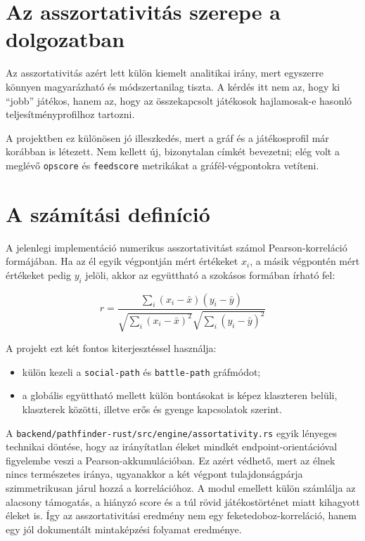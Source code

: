 ﻿\documentclass[a4paper,12pt]{report}
\begin{document}
\section{Az asszortativitás szerepe a dolgozatban}

Az asszortativitás azért lett külön kiemelt analitikai irány, mert egyszerre könnyen magyarázható és módszertanilag tiszta. A kérdés itt nem az, hogy ki ``jobb'' játékos, hanem az, hogy az összekapcsolt játékosok hajlamosak-e hasonló teljesítményprofilhoz tartozni.

A projektben ez különösen jó illeszkedés, mert a gráf és a játékosprofil már korábban is létezett. Nem kellett új, bizonytalan címkét bevezetni; elég volt a meglévő \texttt{opscore} és \texttt{feedscore} metrikákat a gráfél-végpontokra vetíteni.

\section{A számítási definíció}

A jelenlegi implementáció numerikus asszortativitást számol Pearson-korreláció formájában. Ha az él egyik végpontján mért értékeket $x_i$, a másik végpontén mért értékeket pedig $y_i$ jelöli, akkor az együttható a szokásos formában írható fel:

\begin{equation}
r = \frac{\sum_i (x_i-\bar{x})(y_i-\bar{y})}{\sqrt{\sum_i (x_i-\bar{x})^2}\sqrt{\sum_i (y_i-\bar{y})^2}}
\end{equation}

A projekt ezt két fontos kiterjesztéssel használja:

\begin{itemize}
    \item külön kezeli a \texttt{social-path} és \texttt{battle-path} gráfmódot;
    \item a globális együttható mellett külön bontásokat is képez klaszteren belüli, klaszterek közötti, illetve erős és gyenge kapcsolatok szerint.
\end{itemize}

A \texttt{backend/pathfinder-rust/src/engine/assortativity.rs} egyik lényeges technikai döntése, hogy az irányítatlan éleket mindkét endpoint-orientációval figyelembe veszi a Pearson-akkumulációban. Ez azért védhető, mert az élnek nincs természetes iránya, ugyanakkor a két végpont tulajdonságpárja szimmetrikusan járul hozzá a korrelációhoz. A modul emellett külön számlálja az alacsony támogatás, a hiányzó score és a túl rövid játékostörténet miatt kihagyott éleket is. Így az asszortativitási eredmény nem egy feketedoboz-korreláció, hanem egy jól dokumentált mintaképzési folyamat eredménye.
\end{document}
